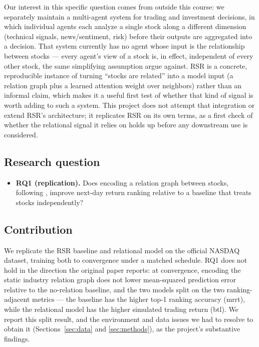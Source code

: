 \documentclass[11pt]{article}
\begin{document}
Our interest in this specific question comes from outside this course: we separately maintain a
multi-agent system for trading and investment decisions, in which individual agents each analyze
a single stock along a different dimension (technical signals, news/sentiment, risk) before their
outputs are aggregated into a decision. That system currently has no agent whose input is the
relationship between stocks --- every agent's view of a stock is, in effect, independent of every
other stock, the same simplifying assumption \citet{feng2019temporal} argue against. RSR is a
concrete, reproducible instance of turning ``stocks are related'' into a model input (a relation
graph plus a learned attention weight over neighbors) rather than an informal claim, which makes
it a useful first test of whether that kind of signal is worth adding to such a system. This
project does not attempt that integration or extend RSR's architecture; it replicates RSR on its
own terms, as a first check of whether the relational signal it relies on holds up before any
downstream use is considered.

\subsection{Research question}

\begin{itemize}
  \item \textbf{RQ1 (replication).} Does encoding a relation graph between stocks, following
  \citet{feng2019temporal}, improve next-day return ranking relative to a baseline that treats
  stocks independently?
\end{itemize}

\subsection{Contribution}

We replicate the RSR baseline and relational model on the official NASDAQ dataset, training both
to convergence under a matched schedule. RQ1 does not hold in the direction the original paper
reports: at convergence, encoding the static industry relation graph does not lower mean-squared
prediction error relative to the no-relation baseline, and the two models split on the two
ranking-adjacent metrics --- the baseline has the higher top-1 ranking accuracy (mrrt), while the
relational model has the higher simulated trading return (btl). We report this split result, and
the environment and data issues we had to resolve to obtain it (Sections~\ref{sec:data} and
\ref{sec:methods}), as the project's substantive findings.
\end{document}
